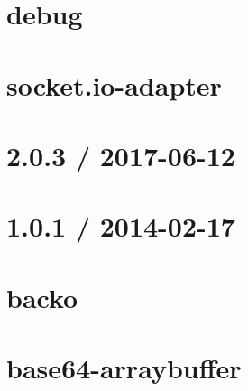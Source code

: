 \documentclass[twoside]{book}
\newcommand{\+}{\discretionary{\mbox{\scriptsize$\hookleftarrow$}}{}{}}
\begin{document}
\chapter{debug}
\label{md_bin_node_modules_socket_8io_node_modules_socket_8io-adapter_node_modules_debug__readme}

\chapter{socket.\+io-\/adapter}
\label{md_bin_node_modules_socket_8io_node_modules_socket_8io-adapter__readme}

\chapter{2.0.3 / 2017-\/06-\/12}
\label{md_bin_node_modules_socket_8io_node_modules_socket_8io-client__history}

\chapter{1.0.1 / 2014-\/02-\/17}
\label{md_bin_node_modules_socket_8io_node_modules_socket_8io-client_node_modules_backo2__history}

\chapter{backo}
\label{md_bin_node_modules_socket_8io_node_modules_socket_8io-client_node_modules_backo2__readme}

\chapter{base64-\/arraybuffer}
\label{md_bin_node_modules_socket_8io_node_modules_socket_8io-client_node_modules_base64-arraybuffer__r_e_a_d_m_e}

\end{document}
